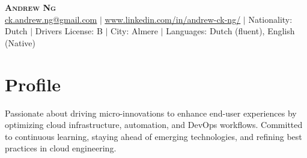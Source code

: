 \documentclass[letterpaper,11pt]{article}
\begin{document}

\begin{center}
    \textbf{\Huge \scshape Andrew Ng} \\ \vspace{1pt}
    \href{mailto:x@x.com}{\underline{ck.andrew.ng@gmail.com}} $|$ 
    \href{https://linkedin.com/in/...}{\underline{www.linkedin.com/in/andrew-ck-ng/}} $|$
    \small Nationality: Dutch $|$ 
    {\small{Drivers License: B}} $|$  {\small{City: Almere}} $|$  
    {\small{Languages: Dutch (fluent), English (Native) }}
\end{center}

\section{Profile}
{\small{Passionate about driving micro-innovations to enhance end-user experiences by optimizing cloud infrastructure, automation, and DevOps workflows. Committed to continuous learning, staying ahead of emerging technologies, and refining best practices in cloud engineering.}}

\vspace{0.3cm}
\end{document}
